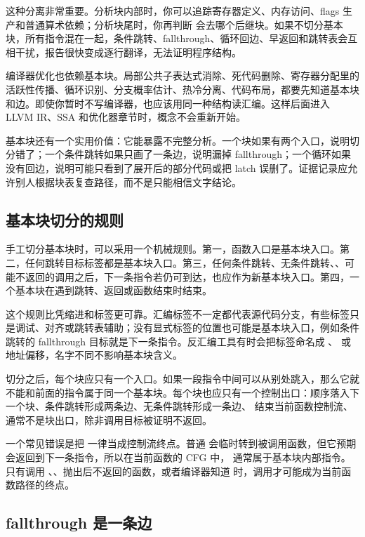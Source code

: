 这种分离非常重要。分析块内部时，你可以追踪寄存器定义、内存访问、flags 生产和普通算术依赖；分析块尾时，你再判断  会去哪个后继块。如果不切分基本块，所有指令混在一起，条件跳转、fallthrough、循环回边、早返回和跳转表会互相干扰，报告很快变成逐行翻译，无法证明程序结构。

编译器优化也依赖基本块。局部公共子表达式消除、死代码删除、寄存器分配里的活跃性传播、循环识别、分支概率估计、热冷分离、代码布局，都要先知道基本块和边。即使你暂时不写编译器，也应该用同一种结构读汇编。这样后面进入 LLVM IR、SSA 和优化器章节时，概念不会重新开始。

基本块还有一个实用价值：它能暴露不完整分析。一个块如果有两个入口，说明切分错了；一个条件跳转如果只画了一条边，说明漏掉 fallthrough；一个循环如果没有回边，说明可能只看到了展开后的部分代码或把 latch 误删了。证据记录应允许别人根据块表复查路径，而不是只能相信文字结论。

\subsection{基本块切分的规则}

手工切分基本块时，可以采用一个机械规则。第一，函数入口是基本块入口。第二，任何跳转目标标签都是基本块入口。第三，任何条件跳转、无条件跳转、、可能不返回的调用之后，下一条指令若仍可到达，也应作为新基本块入口。第四，一个基本块在遇到跳转、返回或函数结束时结束。

这个规则比凭缩进和标签更可靠。汇编标签不一定都代表源代码分支，有些标签只是调试、对齐或跳转表辅助；没有显式标签的位置也可能是基本块入口，例如条件跳转的 fallthrough 目标就是下一条指令。反汇编工具有时会把标签命名成 、 或地址偏移，名字不同不影响基本块含义。

切分之后，每个块应只有一个入口。如果一段指令中间可以从别处跳入，那么它就不能和前面的指令属于同一个基本块。每个块也应只有一个控制出口：顺序落入下一个块、条件跳转形成两条边、无条件跳转形成一条边、 结束当前函数控制流、 通常不是块出口，除非调用目标被证明不返回。

一个常见错误是把  一律当成控制流终点。普通  会临时转到被调用函数，但它预期会返回到下一条指令，所以在当前函数的 CFG 中， 通常属于基本块内部指令。只有调用 、、抛出后不返回的函数，或者编译器知道 \code{[[noreturn]]} 时，调用才可能成为当前函数路径的终点。

\subsection{fallthrough 是一条边}

